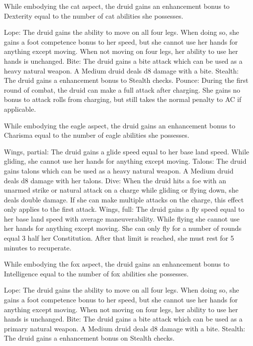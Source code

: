 While embodying the cat aspect, the druid gains an enhancement bonus to Dexterity equal to the number of cat abilities she possesses.
\begin{wildaspect}
\wilditem Lope: The druid gains the ability to move on all four legs. When doing so, she gains a  foot competence bonus to her speed, but she cannot use her hands for anything except moving. When not moving on four legs, her ability to use her hands is unchanged.
\wilditem Bite: The druid gains a bite attack which can be used as a heavy natural weapon. A Medium druid deals d8 damage with a bite.
\wilditem Stealth: The druid gains a  enhancement bonus to Stealth checks.
\wilditem Pounce: During the first round of combat, the druid can make a full attack after charging. She gains no bonus to attack rolls from charging, but still takes the normal penalty to AC if applicable.
\end{wildaspect}

While embodying the eagle aspect, the druid gains an enhancement bonus to Charisma equal to the number of eagle abilities she possesses.
\begin{wildaspect}
\wilditem Wings, partial: The druid gains a glide speed equal to her base land speed. While gliding, she cannot use her hands for anything except moving.
\wilditem Talons: The druid gains talons which can be used as a heavy natural weapon. A Medium druid deals d8 damage with her talons.
\wilditem Dive: When the druid hits a foe with an unarmed strike or natural attack on a charge while gliding or flying down, she deals double damage. If she can make multiple attacks on the charge, this effect only applies to the first attack.
\wilditem Wings, full: The druid gains a fly speed equal to her base land speed with average maneuverability. While flying she cannot use her hands for anything except moving. She can only fly for a number of rounds equal 3 \add half her Constitution. After that limit is reached, she must rest for 5 minutes to recuperate.
\end{wildaspect}

While embodying the fox aspect, the druid gains an enhancement bonus to Intelligence equal to the number of fox abilities she possesses.
\begin{wildaspect}
\wilditem Lope: The druid gains the ability to move on all four legs. When doing so, she gains a  foot competence bonus to her speed, but she cannot use her hands for anything except moving. When not moving on four legs, her ability to use her hands is unchanged.
\wilditem Bite: The druid gains a bite attack which can be used as a primary natural weapon. A Medium druid deals d8 damage with a bite.
\wilditem Stealth: The druid gains a  enhancement bonus on Stealth checks.
\wilditem
\end{wildaspect}

